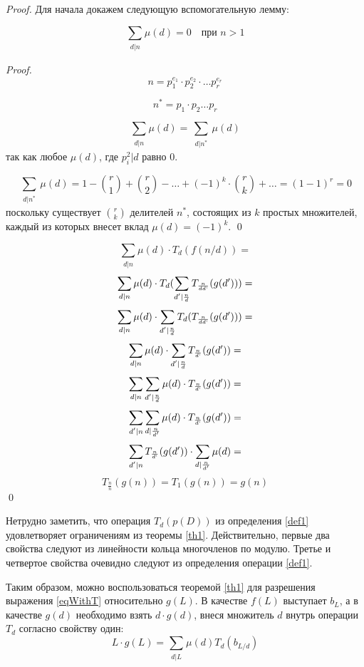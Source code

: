 \begin{proof}
Для начала докажем следующую вспомогательную лемму:
  
\begin{lemma}
\[
  \sum_{\substack{d|n}}\mu(d)=0 \quad \text{при } n > 1
\]
\end{lemma}


\begin{proof}
  \[
  n = p_1^{e_1} \cdot p_2^{e_2} \cdot \ldots p_r^{e_r}
  \]

\[
n^{\ast}=p_1 \cdot p_2 \ldots p_r
\]

\[
\sum_{\substack{d|n}}\mu(d)=\sum_{\substack{d|n^{\ast}}}\mu(d)
\]
 так как любое $\mu(d)$, где $p_i^2|d$ равно $0$.
 
\[
\sum_{\substack{d|n^{\ast}}}\mu(d)=1-\binom{r}{1}+\binom{r}{2}-\dotsc+(-1)^k \cdot \binom{r}{k}+ \dotsc = (1-1)^r=0
\]
поскольку существует $\binom{r}{k}$ делителей $n^{\ast}$, состоящих из $k$ простых множителей,
каждый из которых внесет вклад $\mu(d)=(-1)^k$. \qed
\end{proof}


\[
  \sum_{\substack{d|n}}\mu(d) \cdot T_d(f(n/d)) = 
\]
\[
  \sum_{\substack{d|n}}\mu(d) \cdot T_d(\sum_{\substack{d'|\frac{n}{d}}}T_{\frac{n}{dd`}}(g(d'))) =
\]
\[
  \sum_{\substack{d|n}}\mu(d) \cdot \sum_{\substack{d'|\frac{n}{d}}}T_d(T_{\frac{n}{dd`}}(g(d'))) =
\]
\[
  \sum_{\substack{d|n}}\mu(d) \cdot \sum_{\substack{d'|\frac{n}{d}}}T_{\frac{n}{d`}}(g(d')) =
\]
\[
  \sum_{\substack{d|n}}\sum_{\substack{d'|\frac{n}{d}}}\mu(d) \cdot T_{\frac{n}{d`}}(g(d')) =
\]
\[
  \sum_{\substack{d'|n}}\sum_{\substack{d|\frac{n}{d'}}}\mu(d) \cdot T_{\frac{n}{d`}}(g(d')) =
\]
\[
  \sum_{\substack{d'|n}}T_{\frac{n}{d`}}(g(d')) \cdot \sum_{\substack{d|\frac{n}{d'}}}\mu(d)  =
\]
\[
  T_{\frac{n}{n}}(g(n))  = T_1(g(n)) = g(n)
\] \qed
\end{proof}

Нетрудно заметить, что операция $T_d(p(D))$ из определения \ref{def1} удовлетворяет ограничениям
из теоремы \ref{th1}. Действительно, первые два свойства следуют из линейности кольца многочленов
по модулю. Третье и четвертое свойства очевидно следуют из определения операции \ref{def1}.

Таким образом, можно воспользоваться теоремой \ref{th1} для разрешения выражения \ref{eqWithT}
относительно $g(L)$. В качестве $f(L)$ выступает $b_L$, а в качестве $g(d)$ необходимо
взять $d \cdot g(d)$, внеся множитель $d$ внутрь операции $T_d$ согласно свойству один:
\[
  L \cdot g(L) = \sum_{\substack{d|L}}\mu(d)T_d(b_{L/d})
\]


